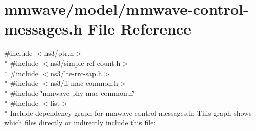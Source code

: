 \hypertarget{mmwave-control-messages_8h}{}\section{mmwave/model/mmwave-\/control-\/messages.h File Reference}
\label{mmwave-control-messages_8h}
{\ttfamily \#include $<$ns3/ptr.\+h$>$}\\*
{\ttfamily \#include $<$ns3/simple-\/ref-\/count.\+h$>$}\\*
{\ttfamily \#include $<$ns3/lte-\/rrc-\/sap.\+h$>$}\\*
{\ttfamily \#include $<$ns3/ff-\/mac-\/common.\+h$>$}\\*
{\ttfamily \#include \char`\"{}mmwave-\/phy-\/mac-\/common.\+h\char`\"{}}\\*
{\ttfamily \#include $<$list$>$}\\*
Include dependency graph for mmwave-\/control-\/messages.h\+:
This graph shows which files directly or indirectly include this file\+:
